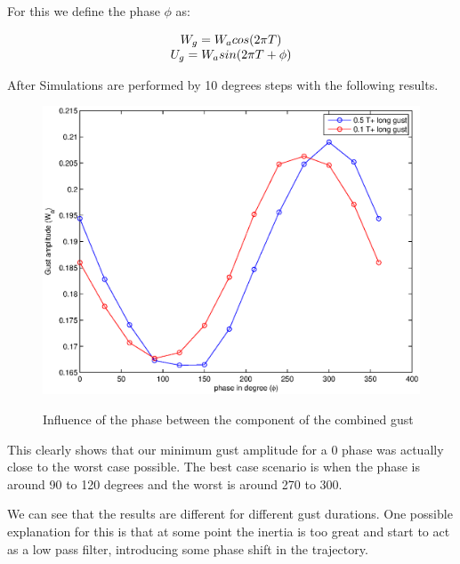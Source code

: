 \par For this we define the phase $\phi$ as:

\begin{equation}
	\begin{array}[c]{c}
		W_g=W_a cos(2\pi T) \\
		U_g=W_a sin(2\pi T + \phi)
	\end{array}
	\label{eqn:combined_gust_phase}
\end{equation}

After Simulations are performed by 10 degrees steps with the following results.

\begin{figure}[ht]
	\begin{center}
		\scalebox{0.8}
		{\includegraphics{./Figures/combined_gust_amplitude_vs_phase.eps}}
	\end{center}
	\caption{Influence of the phase between the component of the combined gust}
	\label{fig:combined_amplitude_phase}
\end{figure}

\par This clearly shows that our minimum gust amplitude for a 0 phase was actually close to the worst case possible.
The best case scenario is when the phase is around 90 to 120 degrees and the worst is around 270 to 300.

\FloatBarrier

\par We can see that the results are different for different gust durations.
One possible explanation for this is that at some point the inertia is too great and start to act as a low pass filter, introducing some phase shift in the trajectory. 



